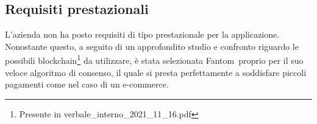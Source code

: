 \subsection{Requisiti prestazionali} \label{subsection:requisiti_prestazionali}

L'azienda non ha posto requisiti di tipo prestazionale per la applicazione.
Nonostante questo, a seguito di un approfondito studio e confronto riguardo le possibili blockchain\footnote{Presente in verbale\_interno\_2021\_11\_16.pdf} da utilizzare, è stata selezionata Fantom\glo\ proprio per il suo veloce algoritmo di consenso, il quale si presta perfettamente a soddisfare piccoli pagamenti
come nel caso di un e-commerce\glo{}.
